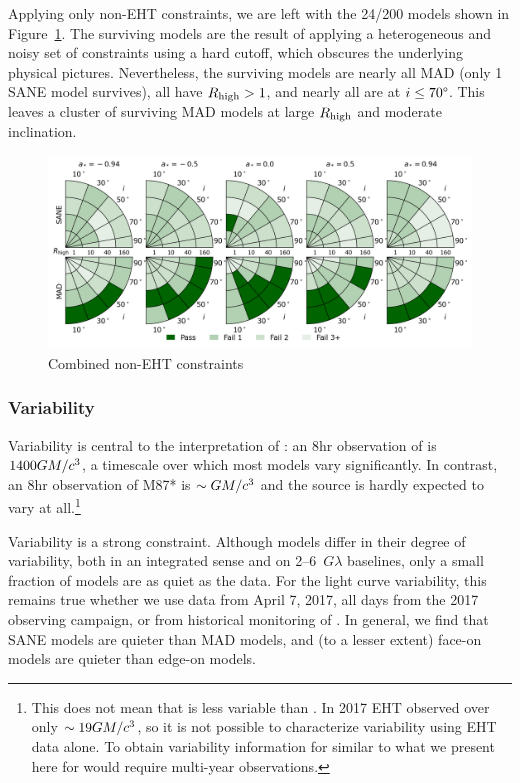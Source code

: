 
Applying only non-EHT constraints, we are left with the 24/200 models shown in Figure~\ref{fig:non_eht_cuts}. The surviving models are the result of applying a heterogeneous and noisy set of constraints using a hard cutoff, which obscures the underlying physical pictures.  Nevertheless, the surviving models are nearly all MAD (only 1 SANE model survives), all have $R_\mathrm{high} > 1$, and nearly all are at $i \le 70\degree$.  This leaves a cluster of surviving MAD models at large $R_\mathrm{high}$ and moderate inclination.

\begin{figure}
  \centering
  \includegraphics[width=\textwidth]{./figures/Non_Interferometric_Constraints.png}
  \caption{Combined non-EHT constraints}
  \label{fig:non_eht_cuts}
\end{figure}

\subsubsection{Variability}

Variability is central to  the interpretation of \sgra: an $8$hr observation of \sgra is $1400 GM/c^3$, a timescale over which most models vary significantly.  In contrast, an $8$hr observation of M87* is $\sim GM/c^3$ and the source is hardly expected to vary at all.\footnote{This does not mean that  is less variable than \sgra.  In 2017 EHT observed  over only $\sim 19GM/c^3$, so it is not possible to characterize  variability using EHT data alone.  To obtain variability information for  similar to what we present here for \sgra would require multi-year observations.}

Variability is a strong constraint.  Although models differ in their degree of variability, both in an integrated sense and on 2--6~$G\lambda$ baselines, only a small fraction of models are as quiet as the data.  For the light curve variability, this remains true whether we use data from April 7, 2017, all days from the 2017 observing campaign, or from historical monitoring of \sgra.   In general, we find that SANE models are quieter than MAD models, and (to a lesser extent) face-on models are quieter than edge-on models.

